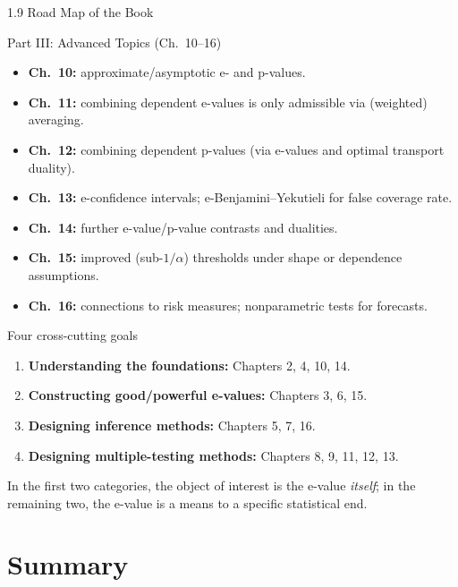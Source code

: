 \documentclass[aspectratio=169,10pt]{beamer}
\begin{document}
\begin{frame}[allowframebreaks]{1.9 Road Map of the Book}
\begin{block}{Part III: Advanced Topics (Ch.\ 10--16)}
\begin{itemize}
  \item \textbf{Ch.\ 10:} approximate/asymptotic e- and p-values.
  \item \textbf{Ch.\ 11:} combining dependent e-values is only admissible
    via (weighted) averaging.
  \item \textbf{Ch.\ 12:} combining dependent p-values (via e-values and
    optimal transport duality).
  \item \textbf{Ch.\ 13:} e-confidence intervals; e-Benjamini--Yekutieli
    for false coverage rate.
  \item \textbf{Ch.\ 14:} further e-value/p-value contrasts and dualities.
  \item \textbf{Ch.\ 15:} improved (sub-$1/\alpha$) thresholds under shape
    or dependence assumptions.
  \item \textbf{Ch.\ 16:} connections to risk measures; nonparametric tests
    for forecasts.
\end{itemize}
\end{block}

\framebreak

\begin{block}{Four cross-cutting goals}
\begin{enumerate}
  \item \textbf{Understanding the foundations:} Chapters 2, 4, 10, 14.
  \item \textbf{Constructing good/powerful e-values:} Chapters 3, 6, 15.
  \item \textbf{Designing inference methods:} Chapters 5, 7, 16.
  \item \textbf{Designing multiple-testing methods:} Chapters 8, 9, 11,
    12, 13.
\end{enumerate}
\end{block}

In the first two categories, the object of interest is the e-value
\emph{itself}; in the remaining two, the e-value is a means to a specific
statistical end.

\end{frame}

\section{Summary}
\end{document}
